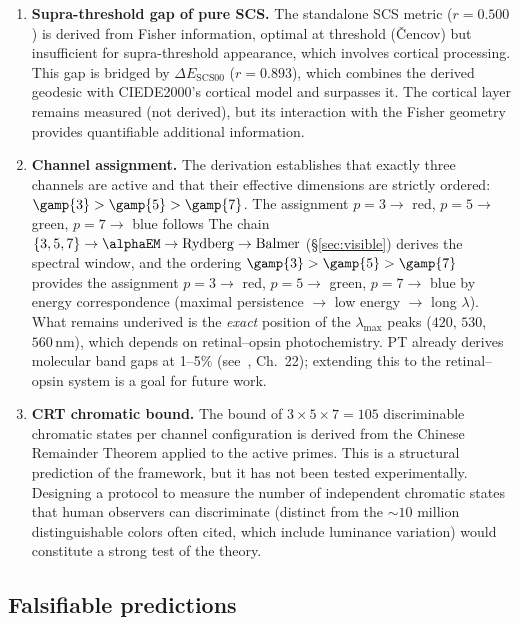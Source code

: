 \documentclass[12pt,a4paper]{article}
\begin{document}
\begin{enumerate}[nosep]
\item \textbf{Supra-threshold gap of pure SCS.} The standalone SCS
  metric ($r = 0.500$) is derived from Fisher information, optimal at
  threshold (\v{C}encov) but insufficient for supra-threshold
  appearance, which involves cortical processing. This gap is bridged
  by $\Delta E_{\mathrm{SCS00}}$ ($r = 0.893$), which combines the
  derived geodesic with CIEDE2000's cortical model and surpasses it.
  The cortical layer remains measured (not derived), but its
  interaction with the Fisher geometry provides quantifiable additional
  information.

\item \textbf{Channel assignment.} The derivation establishes that
  exactly three channels are active and that their effective dimensions
  are strictly ordered: $\gamp{3} > \gamp{5} > \gamp{7}$. The
  assignment $p=3 \to$ red, $p=5 \to$ green, $p=7 \to$ blue follows
  The chain $\{3,5,7\} \to \alphaEM \to \mathrm{Rydberg} \to
  \mathrm{Balmer}$ (\S\ref{sec:visible}) derives the spectral window,
  and the ordering $\gamp{3} > \gamp{5} > \gamp{7}$ provides the
  assignment $p=3 \to$ red, $p=5 \to$ green, $p=7 \to$ blue by energy
  correspondence (maximal persistence $\to$ low energy $\to$ long
  $\lambda$). What remains underived is the \emph{exact} position of
  the $\lambda_{\max}$ peaks ($420$, $530$, $560\,\mathrm{nm}$), which
  depends on retinal--opsin photochemistry. PT already derives molecular
  band gaps at 1--5\% (see~\cite{senez2026math}, Ch.~22); extending
  this to the retinal--opsin system is a goal for future work.

\item \textbf{CRT chromatic bound.} The bound of $3 \times 5 \times
  7 = 105$ discriminable chromatic states per channel configuration
  is derived from the Chinese Remainder Theorem applied to the active
  primes. This is a structural prediction of the framework, but it
  has not been tested experimentally. Designing a protocol to measure
  the number of independent chromatic states that human observers can
  discriminate (distinct from the $\sim\!10$ million distinguishable
  colors often cited, which include luminance variation) would
  constitute a strong test of the theory.
\end{enumerate}

\subsection{Falsifiable predictions}
\end{document}
